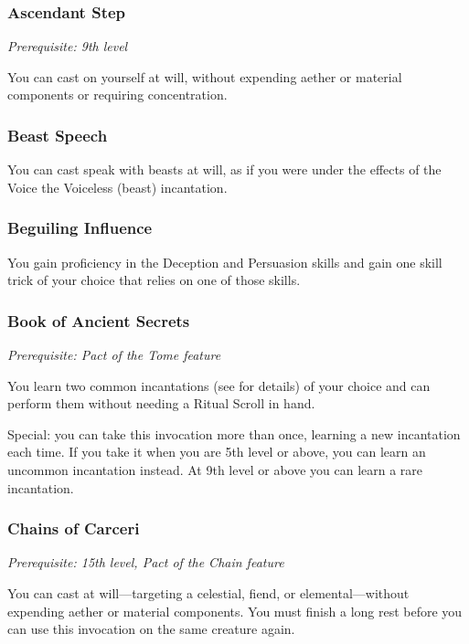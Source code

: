 \subsubsection{Ascendant Step}

\textit{Prerequisite: 9th level}

You can cast  on yourself at will, without expending aether or material components or requiring concentration.

\subsubsection{Beast Speech}

You can cast speak with beasts at will, as if you were under the effects of the Voice the Voiceless (beast) incantation.

\subsubsection{Beguiling Influence}

You gain proficiency in the Deception and Persuasion skills and gain one skill trick of your choice that relies on one of those skills.

\subsubsection{Book of Ancient Secrets}

\textit{Prerequisite: Pact of the Tome feature}

You learn two common incantations (see  for details) of your choice and can perform them without needing a Ritual Scroll in hand.

Special: you can take this invocation more than once, learning a new incantation each time. If you take it when you are 5th level or above, you can learn an uncommon incantation instead. At 9th level or above you can learn a rare incantation.

\subsubsection{Chains of Carceri}

\textit{Prerequisite: 15th level, Pact of the Chain feature}

You can cast  at will—targeting a celestial, fiend, or elemental—without expending aether or material components. You must finish a long rest before you can use this invocation on the same creature again.

